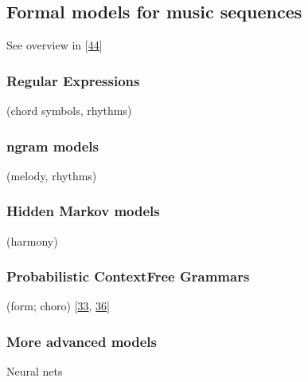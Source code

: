 \documentclass[letterpaper,10pt,english]{sphinxmanual}
\begin{document}
\subsection{Formal models for music sequences}
\label{\detokenize{6_advanced:formal-models-for-music-sequences}}
\sphinxAtStartPar
See overview in {[}\hyperlink{cite.8_bibliography:id11}{44}{]}


\subsubsection{Regular Expressions}
\label{\detokenize{6_advanced:regular-expressions}}
\sphinxAtStartPar
(chord symbols, rhythms)


\subsubsection{n\sphinxhyphen{}gram models}
\label{\detokenize{6_advanced:n-gram-models}}
\sphinxAtStartPar
(melody, rhythms)


\subsubsection{Hidden Markov models}
\label{\detokenize{6_advanced:hidden-markov-models}}
\sphinxAtStartPar
(harmony)


\subsubsection{Probabilistic Context\sphinxhyphen{}Free Grammars}
\label{\detokenize{6_advanced:probabilistic-context-free-grammars}}
\sphinxAtStartPar
(form; choro) {[}\hyperlink{cite.8_bibliography:id8}{33}, \hyperlink{cite.8_bibliography:id10}{36}{]}


\subsubsection{More advanced models}
\label{\detokenize{6_advanced:more-advanced-models}}
\sphinxAtStartPar
Neural nets

\cleardoublepage
\begingroup
\renewcommand\chapter[1]{\endgroup}


\chapter{Bibliography}
\label{\detokenize{8_bibliography:bibliography}}\label{\detokenize{8_bibliography::doc}}
\sphinxAtStartPar
\end{document}

